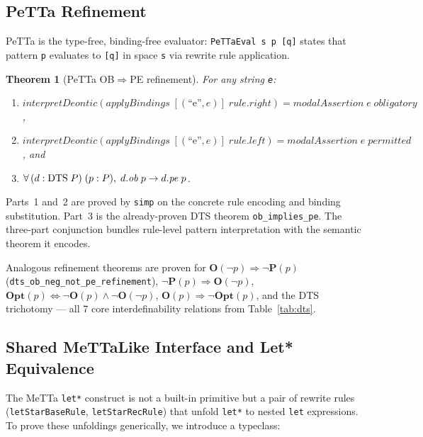 \documentclass[]{article}
\newtheorem{theorem}{Theorem}
\newcommand{\code}[1]{\texttt{#1}}
\newcommand{\OB}{\ensuremath{\mathbf{O}}}
\newcommand{\PE}{\ensuremath{\mathbf{P}}}
\newcommand{\OP}{\ensuremath{\mathbf{Opt}}}
\newcommand{\DTS}{\textup{DTS}}
\begin{document}
\subsection{PeTTa Refinement}

PeTTa is the type-free, binding-free evaluator: \code{PeTTaEval s p [q]} states
that pattern \code{p} evaluates to \code{[q]} in space \code{s} via rewrite
rule application.

\begin{theorem}[PeTTa OB$\Rightarrow$PE refinement]
\label{thm:petta-ob-pe}
For any string \code{e}:
\begin{enumerate}
\item $\mathit{interpretDeontic}(\mathit{applyBindings}\;[(\text{``e''}, e)]\;\mathit{rule.right})
       = \mathit{modalAssertion}\; e\; \mathit{obligatory}$,
\item $\mathit{interpretDeontic}(\mathit{applyBindings}\;[(\text{``e''}, e)]\;\mathit{rule.left})
       = \mathit{modalAssertion}\; e\; \mathit{permitted}$, and
\item $\forall\, (d : \DTS{}\;P)\;(p : P),\; d.\mathit{ob}\;p \to d.\mathit{pe}\;p$.
\end{enumerate}
\end{theorem}

\noindent
Parts~1 and~2 are proved by \code{simp} on the concrete rule encoding and
binding substitution.  Part~3 is the already-proven \DTS{} theorem
\code{ob\_implies\_pe}.  The three-part conjunction bundles rule-level
pattern interpretation with the semantic theorem it encodes.

Analogous refinement theorems are proven for $\OB(\neg p) \Rightarrow \neg\PE(p)$
(\code{dts\_ob\_neg\_not\_pe\_refinement}), $\neg\PE(p) \Rightarrow \OB(\neg p)$,
$\OP(p) \Leftrightarrow \neg\OB(p) \wedge \neg\OB(\neg p)$,
$\OB(p) \Rightarrow \neg\OP(p)$, and the \DTS{} trichotomy --- all 7 core
interdefinability relations from Table~\ref{tab:dts}.

\subsection{Shared MeTTaLike Interface and Let* Equivalence}

The MeTTa \code{let*} construct is not a built-in primitive but a pair of
rewrite rules (\code{letStarBaseRule}, \code{letStarRecRule}) that unfold
\code{let*} to nested \code{let} expressions.  To prove these unfoldings
generically, we introduce a typeclass:
\end{document}
